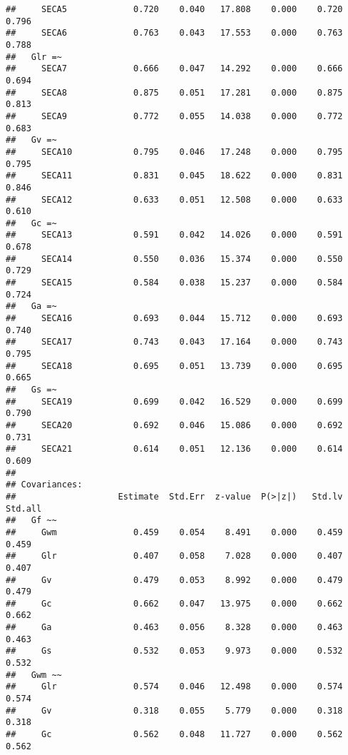 \documentclass[
]{article}
\begin{document}
\begin{verbatim}
##     SECA5             0.720    0.040   17.808    0.000    0.720    0.796
##     SECA6             0.763    0.043   17.553    0.000    0.763    0.788
##   Glr =~                                                                
##     SECA7             0.666    0.047   14.292    0.000    0.666    0.694
##     SECA8             0.875    0.051   17.281    0.000    0.875    0.813
##     SECA9             0.772    0.055   14.038    0.000    0.772    0.683
##   Gv =~                                                                 
##     SECA10            0.795    0.046   17.248    0.000    0.795    0.795
##     SECA11            0.831    0.045   18.622    0.000    0.831    0.846
##     SECA12            0.633    0.051   12.508    0.000    0.633    0.610
##   Gc =~                                                                 
##     SECA13            0.591    0.042   14.026    0.000    0.591    0.678
##     SECA14            0.550    0.036   15.374    0.000    0.550    0.729
##     SECA15            0.584    0.038   15.237    0.000    0.584    0.724
##   Ga =~                                                                 
##     SECA16            0.693    0.044   15.712    0.000    0.693    0.740
##     SECA17            0.743    0.043   17.164    0.000    0.743    0.795
##     SECA18            0.695    0.051   13.739    0.000    0.695    0.665
##   Gs =~                                                                 
##     SECA19            0.699    0.042   16.529    0.000    0.699    0.790
##     SECA20            0.692    0.046   15.086    0.000    0.692    0.731
##     SECA21            0.614    0.051   12.136    0.000    0.614    0.609
## 
## Covariances:
##                    Estimate  Std.Err  z-value  P(>|z|)   Std.lv  Std.all
##   Gf ~~                                                                 
##     Gwm               0.459    0.054    8.491    0.000    0.459    0.459
##     Glr               0.407    0.058    7.028    0.000    0.407    0.407
##     Gv                0.479    0.053    8.992    0.000    0.479    0.479
##     Gc                0.662    0.047   13.975    0.000    0.662    0.662
##     Ga                0.463    0.056    8.328    0.000    0.463    0.463
##     Gs                0.532    0.053    9.973    0.000    0.532    0.532
##   Gwm ~~                                                                
##     Glr               0.574    0.046   12.498    0.000    0.574    0.574
##     Gv                0.318    0.055    5.779    0.000    0.318    0.318
##     Gc                0.562    0.048   11.727    0.000    0.562    0.562

\end{verbatim}
\end{document}

